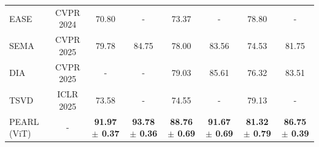\documentclass[10pt]{article} %
\begin{document}
\begin{table}[ht]
{\begin{tabular}{@{}l|c|c|c|c|c|c|c@{}}


        \midrule

        EASE \citep{zhou2024expandable} & CVPR 2024 & 70.80     & $\:\:\:$ - $\:\:\:$  & 73.37  &  $\:\:\:$ - $\:\:\:$  &  78.80    &   $\:\:\:$ - $\:\:\:$  \\
        
        SEMA \citep{SEMA} & CVPR 2025 & 79.78 & 84.75   & 78.00    & 83.56     & 74.53    & 81.75   \\
     
         DIA \citep{DIA} & CVPR 2025 &   $\:\:\:$ - $\:\:\:$ &     $\:\:\:$ - $\:\:\:$  & 79.03    &  85.61   &  76.32    &   83.51  \\

          TSVD \citep{TSVD} & ICLR 2025 & 73.58    & $\:\:\:$ - $\:\:\:$  &  74.55  &  $\:\:\:$ - $\:\:\:$  &  79.13    &   $\:\:\:$ - $\:\:\:$  \\
        
        \midrule 
        PEARL (ViT) & - & \textbf{91.97 $\pm$ 0.37} & \textbf{93.78 $\pm$ 0.36} & \textbf{88.76 $\pm$ 0.69} & \textbf{91.67 $\pm$ 0.69} & \textbf{81.32 $\pm$ 0.79} & \textbf{86.75 $\pm$ 0.39} \\
        
        \bottomrule
    \end{tabular}%
    }
    \label{tab:imagenet_r_results}
\end{table}
\end{document}

